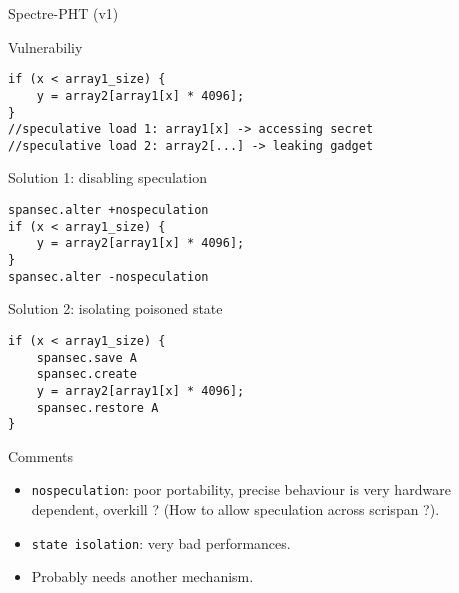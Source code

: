 \documentclass[11pt]{beamer}
\newcommand{\xmark}{\textcolor{red}{\ding{55}}}%
\begin{document}
\begin{frame}{Spectre-PHT (v1)}
        \begin{block}{Vulnerabiliy}
                \begin{verbatim}
if (x < array1_size) {
    y = array2[array1[x] * 4096];
}
//speculative load 1: array1[x] -> accessing secret
//speculative load 2: array2[...] -> leaking gadget
                \end{verbatim}
        \end{block}        

        \begin{block}{Solution 1: disabling speculation}
                \begin{verbatim}
spansec.alter +nospeculation
if (x < array1_size) {
    y = array2[array1[x] * 4096];
}
spansec.alter -nospeculation
                \end{verbatim}
        \end{block}
\framebreak
        \begin{block}{Solution 2: isolating poisoned state}
                \begin{verbatim}
if (x < array1_size) {
    spansec.save A
    spansec.create
    y = array2[array1[x] * 4096];
    spansec.restore A
}
                \end{verbatim}
        \end{block}

        \begin{alertblock}{Comments}
                \begin{itemize}
                        \item \xmark{} \texttt{nospeculation}: poor portability, precise behaviour is very hardware dependent, overkill ? (How to allow speculation across scrispan ?).
                        \item \xmark{} \texttt{state isolation}: very bad performances.
                        \item Probably needs another mechanism.
                \end{itemize}
        \end{alertblock}
\end{frame}
\end{document}
